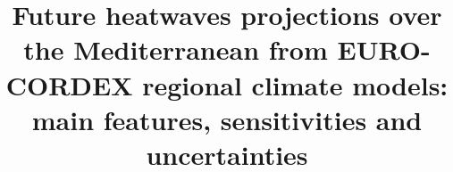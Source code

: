 %
%
%
%
%
%
%
\documentclass{svjour3}                     %
%
\smartqed  %
%
\usepackage{graphicx}
%
%
%
%
%
\usepackage[
backend=biber,
style=alphabetic,
sorting=ynt
]{biblatex}



\title{Future heatwaves projections over the Mediterranean 
from EURO-CORDEX regional climate models: main features, sensitivities and uncertainties}


